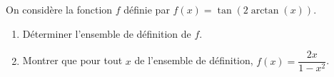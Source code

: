 
\begin{exercice}\label{exoautoanalyseCTU-10}

On considère la fonction $f$ définie par $f(x)=\tan(2 \arctan (x))$.

\begin{enumerate}
\item Déterminer l'ensemble de définition de $f$.
\item Montrer que pour tout $x$ de l'ensemble de définition, $f(x)=\dfrac{2x}{1-x^2}$.
\end{enumerate}

\end{exercice}
